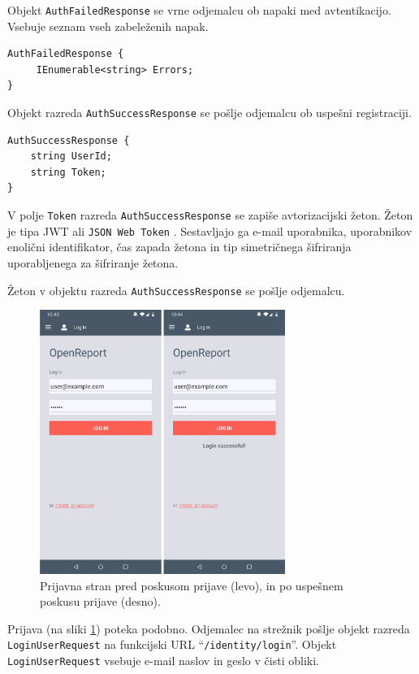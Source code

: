 \documentclass[a4paper, 12pt]{book}
\begin{document}
Objekt \texttt{AuthFailedResponse} se vrne odjemalcu ob napaki med avtentikacijo.
Vsebuje seznam vseh zabeleženih napak.

\begin{verbatim}
AuthFailedResponse { 
     IEnumerable<string> Errors; 
}
\end{verbatim}

Objekt razreda \texttt{AuthSuccessResponse} se pošlje odjemalcu ob uspešni registraciji.

\begin{verbatim}
AuthSuccessResponse { 
    string UserId; 
    string Token; 
} 
\end{verbatim}

V polje \texttt{Token} razreda \texttt{AuthSuccessResponse} se zapiše avtorizacijski žeton.
Žeton je tipa JWT ali \texttt{JSON Web Token} \cite{jwtinfo}.
Sestavljajo ga e-mail uporabnika, uporabnikov enolični identifikator, čas zapada žetona in tip simetričnega šifriranja uporabljenega za šifriranje žetona.

Žeton v objektu razreda \texttt{AuthSuccessResponse} se pošlje odjemalcu.

\clearpage

\begin{figure}[H]
\begin{center}
\includegraphics[width=8cm]{app_login}
\end{center}
	\caption{Prijavna stran pred poskusom prijave (levo), in po uspešnem poskusu prijave (desno).}
\label{app_login}
\end{figure}

Prijava (na sliki \ref{app_login}) poteka podobno.
Odjemalec na strežnik pošlje objekt razreda \texttt{LoginUserRequest} na funkcijski URL \enquote{\texttt{/identity/login}}.
Objekt \texttt{LoginUserRequest} vsebuje e-mail naslov in geslo v čisti obliki.
\end{document}
